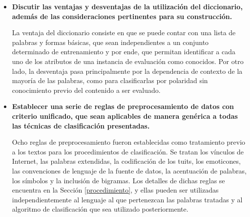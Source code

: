 \begin{itemize}
Confeccionamos el diccionario mencionado a partir del conjunto de muestra, que luego fue utilizado en un enfoque simple de clasificaci\'on basado en l\'exico con resultados aceptables. Las listas finales de palabras est\'an constituidas por 180 entradas positivas y por 634 entradas negativas, las cuales pueden verse listadas en detalle en el Ap\'endice \ref{Anexos}. Durante el proceso de confecci\'on pudimos observar adem\'as, que no solamente las palabras en espa\~nol y el guaran\'i componen el corpus del lenguaje abordado, sino que adem\'as existe una cantidad de palabras diferentes en ingl\'es mayor a la cantidad de palabras en guaran\'i y una peque\~na cantidad de palabras en portugu\'es (Secci\'on \ref{sec:categorizacion}). Esto implica que el an\'alisis de estrategias basadas en l\'exico no puede limitarse al espa\~nol y al guaran\'i, y que dicha consideraci\'on puede ser \'util adem\'as para paliar las dificultades que representan las ocurrencias \'unicas de las palabras en lenguajes diferentes, es decir, que no se repiten varias veces para los clasificadores de m\'aquina.
\newline

\item \textbf{Discutir las ventajas y desventajas de la utilizaci\'on del diccionario, adem\'as de las consideraciones pertinentes para su construcci\'on.}
\newline

La ventaja del diccionario consiste en que se puede contar con una lista de palabras y formas b\'asicas, que sean independientes a un conjunto determinado de entrenamiento y por ende, que permitan identificar a cada uno de los atributos de una instancia de evaluaci\'on como conocidos. Por otro lado, la desventaja pasa principalmente por la dependencia de contexto de la mayor\'ia de las palabras, como para clasificarlas por polaridad sin conocimiento previo del contenido a ser evaluado.
\newline

\item \textbf{Establecer una serie de reglas de preprocesamiento de datos con criterio unificado, que sean aplicables de manera gen\'erica a todas las t\'ecnicas de clasificaci\'on presentadas.} 

Ocho reglas de preprocesamiento fueron establecidas como tratamiento previo a los textos para los procedimientos de clasificaci\'on. Se tratan los v\'inculos de Internet, las palabras extendidas, la codificaci\'on de los tuits, los emoticones, las convenciones de lenguaje de la fuente de datos, la acentuaci\'on de palabras, los s\'imbolos y la inclusi\'on de bigramas. Los detalles de dichas reglas se encuentra en la Secci\'on \ref{procedimiento}, y ellas pueden ser utilizadas independientemente al lenguaje al que pertenezcan las palabras tratadas y al algoritmo de clasificaci\'on que sea utilizado posteriormente. 
\newline


\end{itemize}
